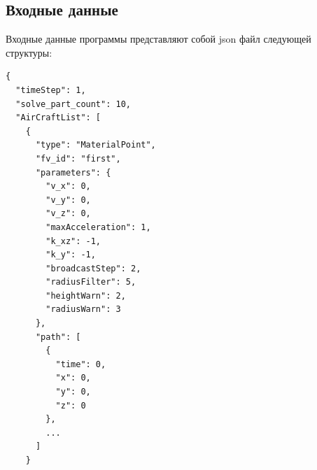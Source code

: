 \documentclass[a4paper,12pt]{article}
\begin{document}
\subsection{Входные данные}
Входные данные программы представляют собой json файл следующей структуры:
\begin{verbatim}
{
  "timeStep": 1,
  "solve_part_count": 10,
  "AirCraftList": [
    {
      "type": "MaterialPoint",
      "fv_id": "first",
      "parameters": {
        "v_x": 0,
        "v_y": 0,
        "v_z": 0,
        "maxAcceleration": 1,
        "k_xz": -1,
        "k_y": -1,
        "broadcastStep": 2,
        "radiusFilter": 5,
        "heightWarn": 2,
        "radiusWarn": 3
      },
      "path": [
        {
          "time": 0,
          "x": 0,
          "y": 0,
          "z": 0
        },
        ...
      ]
    }
\end{verbatim}
\end{document}

